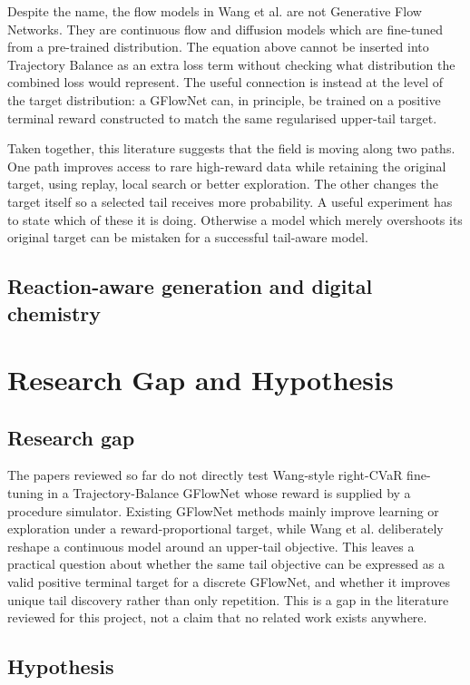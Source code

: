 \documentclass{article}
\begin{document}
Despite the name, the flow models in Wang et al. are not Generative Flow Networks. They are continuous flow and diffusion models which are fine-tuned from a pre-trained distribution. The equation above cannot be inserted into Trajectory Balance as an extra loss term without checking what distribution the combined loss would represent. The useful connection is instead at the level of the target distribution: a GFlowNet can, in principle, be trained on a positive terminal reward constructed to match the same regularised upper-tail target.

Taken together, this literature suggests that the field is moving along two paths. One path improves access to rare high-reward data while retaining the original target, using replay, local search or better exploration. The other changes the target itself so a selected tail receives more probability. A useful experiment has to state which of these it is doing. Otherwise a model which merely overshoots its original target can be mistaken for a successful tail-aware model.

\subsection{Reaction-aware generation and digital chemistry}

\section{Research Gap and Hypothesis}

\subsection{Research gap}

The papers reviewed so far do not directly test Wang-style right-CVaR fine-tuning in a Trajectory-Balance GFlowNet whose reward is supplied by a procedure simulator. Existing GFlowNet methods mainly improve learning or exploration under a reward-proportional target, while Wang et al. deliberately reshape a continuous model around an upper-tail objective. This leaves a practical question about whether the same tail objective can be expressed as a valid positive terminal target for a discrete GFlowNet, and whether it improves unique tail discovery rather than only repetition. This is a gap in the literature reviewed for this project, not a claim that no related work exists anywhere.

\subsection{Hypothesis}
\end{document}

